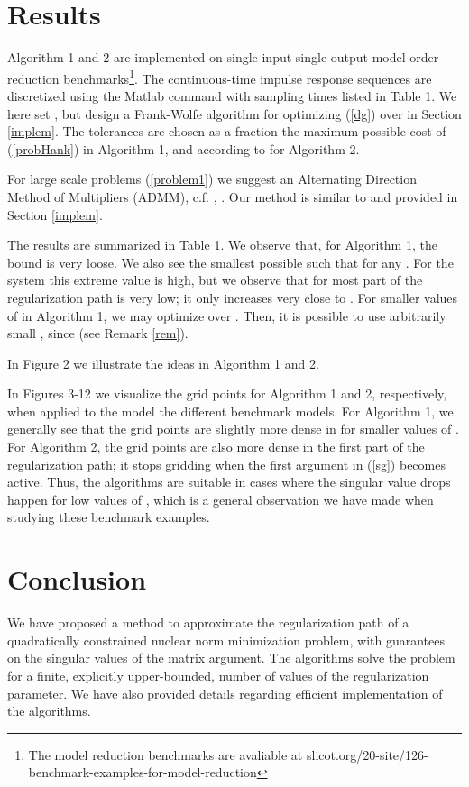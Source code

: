\documentclass{article}
\begin{document}
\section{Results}

Algorithm 1 and 2 are implemented on single-input-single-output model order reduction benchmarks\footnote{The model reduction benchmarks are avaliable at slicot.org/20-site/126-benchmark-examples-for-model-reduction}. The continuous-time impulse response sequences are discretized using the Matlab command  with sampling times listed in Table 1. We here set , but design a Frank-Wolfe algorithm for optimizing (\ref{dg}) over  in Section \ref{implem}. The tolerances  are chosen as a fraction the maximum possible cost of (\ref{probHank}) in Algorithm 1, and according to  for Algorithm 2.

For large scale problems (\ref{problem1}) we suggest an Alternating Direction Method of Multipliers (ADMM), c.f. \cite{Boyd:2010}, \cite{Yang:2012}. Our method is similar to \cite{Liu:2013} and provided in Section \ref{implem}.

The results are summarized in Table 1. We observe that, for Algorithm 1, the bound  is very loose. We also see the smallest possible  such that  for any . For the system  this extreme value is high, but we observe that for most part of the regularization path  is very low; it only increases very close to . For smaller values of  in Algorithm 1, we may optimize over . Then, it is possible to use arbitrarily small , since  (see Remark \ref{rem}).

In Figure 2 we illustrate the ideas in Algorithm 1 and 2.

In Figures 3-12 we visualize the grid points for Algorithm 1 and 2, respectively, when applied to the model the different benchmark models. For Algorithm 1, we generally see that the grid points are slightly more dense in for smaller values of . For Algorithm 2, the grid points are also more dense in the first part of the regularization path; it stops gridding when the first argument in (\ref{sg}) becomes active. Thus, the algorithms are suitable in cases where the singular value drops happen for low values of , which is a general observation we have made when studying these benchmark examples.

\section{Conclusion}

We have proposed a method to approximate the regularization path of a quadratically constrained nuclear norm minimization problem, with guarantees on the singular values of the matrix argument. The algorithms solve the problem for a finite, explicitly upper-bounded, number of values of the regularization parameter. We have also provided details regarding efficient implementation of the algorithms.
\end{document}
